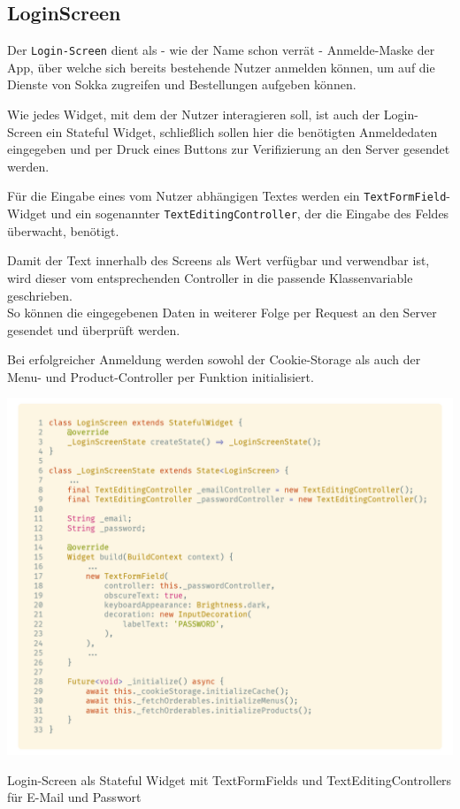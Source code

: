 \subsection{LoginScreen}

Der \lstinline{Login-Screen} dient als - wie der Name schon verrät - Anmelde-Maske der App, über 
welche sich bereits bestehende Nutzer anmelden können, um auf die Dienste von Sokka zugreifen und
Bestellungen aufgeben können.

Wie jedes Widget, mit dem der Nutzer interagieren soll, ist auch der Login-Screen ein Stateful 
Widget, schließlich sollen hier die benötigten Anmeldedaten eingegeben und per Druck eines Buttons
zur Verifizierung an den Server gesendet werden.

Für die Eingabe eines vom Nutzer abhängigen Textes werden ein \lstinline{TextFormField}-Widget
und ein sogenannter \lstinline{TextEditingController}, der die Eingabe des Feldes überwacht,
benötigt.

Damit der Text innerhalb des Screens als Wert verfügbar und verwendbar ist, wird dieser vom entsprechenden
Controller in die passende Klassenvariable geschrieben.\\
So können die eingegebenen Daten in weiterer Folge per Request an den Server gesendet und überprüft werden.

\newpage

Bei erfolgreicher Anmeldung werden sowohl der Cookie-Storage als auch der Menu- und
Product-Controller per Funktion initialisiert.

\begin{code}[H]
    \centering
    \includegraphics[width=1\textwidth]{images/Client/screens/login/loginScreen.png}
    \caption{Login-Screen als Stateful Widget mit TextFormFields und TextEditingControllers für E-Mail und Passwort}
\end{code}

\newpage